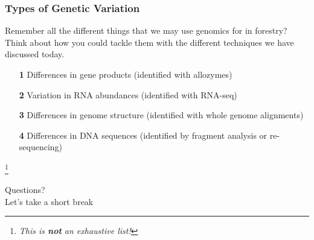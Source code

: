 \documentclass{beamer}
\newcommand\blfootnote[1]{%
	\begingroup
	\renewcommand\thefootnote{}\footnote{#1}%
	\addtocounter{footnote}{-1}%
	\endgroup
}
\begin{document}
\begin{frame}
	\frametitle{Types of Genetic Variation}
Remember all the different things that we may use genomics for in forestry? Think about how you could tackle them with the different techniques we have discussed today.
\vspace{20pt}
	\scriptsize
	\begin{itemize}
		\item[\textbf{1}] Differences in gene products (identified with allozymes)
		\item[\textbf{2}] Variation in RNA abundances (identified with RNA-seq)
		\item[\textbf{3}] Differences in genome structure (identified with whole genome alignments)
		\item[\textbf{4}] Differences in DNA sequences (identified by fragment analysis or re-sequencing)
	\end{itemize}
	
	\blfootnote{\textit{This is \textbf{not} an exhaustive list!}}
	
\end{frame}



\begin{frame}

	\Huge
	Questions? \\ \pause
	Let's take a short break
	
\end{frame}
\end{document}
